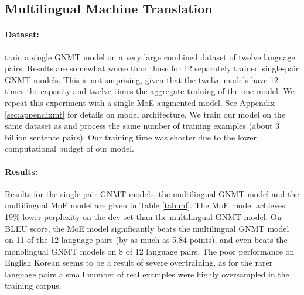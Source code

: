 \documentclass{article} \pdfoutput=1
\begin{document}
\subsection{Multilingual Machine Translation}
\label{sec:mlmt}

\paragraph{Dataset:} \citep{Johnson16} train a single GNMT \citep{GNMT} model on a very large combined dataset of twelve language pairs.  Results are somewhat worse than those for 12 separately trained single-pair GNMT models.  This is not surprising, given that the twelve models have 12 times the capacity and twelve times the aggregate training of the one model.  We repeat this experiment with a single MoE-augmented model.  See Appendix \ref{sec:appendixmt} for details on model architecture.  We train our model on the same dataset as \citep{Johnson16} and process the same number of training examples (about 3 billion sentence pairs).  Our training time was shorter due to the lower computational budget of our model.

\paragraph{Results:} Results for the single-pair GNMT models, the multilingual GNMT model and the multilingual MoE model are given in Table \ref{tab:ml}.   The MoE model achieves 19\% lower perplexity on the dev set than the multilingual GNMT model.   On BLEU score, the MoE model significantly beats the multilingual GNMT model on 11 of the 12 language pairs (by as much as 5.84 points), and even beats the monolingual GNMT models on 8 of 12 language pairs.  The poor performance on English  Korean seems to be a result of severe overtraining, as for the rarer language pairs a small number of real examples were highly oversampled in the training corpus. 
\end{document}

